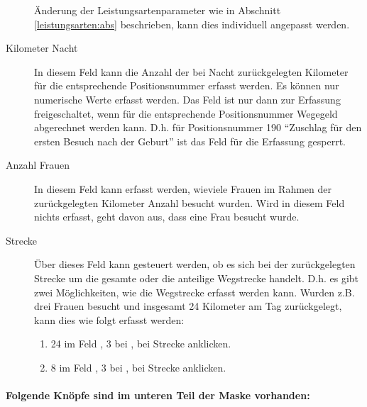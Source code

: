 \begin{description}
{Änderung der Leistungsartenparameter wie in  Abschnitt
\vref{leistungsarten:abs} beschrieben, kann dies individuell angepasst
werden}.
\item[Kilometer Nacht]
In diesem Feld kann die Anzahl der bei Nacht zurückgelegten Kilometer für die
entsprechende Positionsnummer erfasst werden. Es können nur numerische
Werte erfasst werden. Das Feld ist nur dann zur Erfassung freigeschaltet,
wenn für die entsprechende Positionsnummer Wegegeld abgerechnet werden
kann. D.h. für Positionsnummer 190 ``Zuschlag für den ersten Besuch nach
der Geburt'' ist das Feld für die Erfassung gesperrt.
\item[Anzahl Frauen]
In diesem Feld kann erfasst werden, wieviele Frauen im Rahmen der 
zurückgelegten Kilometer Anzahl besucht wurden. Wird in diesem Feld nichts
erfasst, geht \tinyHeb\/ davon aus, dass eine Frau besucht wurde.
\item[Strecke]
Über dieses Feld kann gesteuert werden, ob es sich bei der zurückgelegten
Strecke um die gesamte oder die anteilige Wegstrecke handelt. D.h.
es gibt zwei Möglichkeiten, wie die Wegstrecke erfasst werden kann.
Wurden z.B. drei Frauen besucht und insgesamt 24 Kilometer am Tag
zurückgelegt, kann dies wie folgt erfasst werden:

\begin{enumerate}
\item 24 im Feld , 3 bei ,
bei Strecke  anklicken.
\item 8 im Feld , 3 bei ,
bei Strecke  anklicken.
\end{enumerate}
\end{description}

\paragraph{Folgende Knöpfe sind im unteren Teil der Maske vorhanden:}

